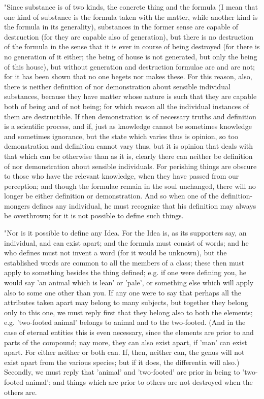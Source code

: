 "Since substance is of two kinds, the concrete thing and the formula
(I mean that one kind of substance is the formula taken with the matter,
while another kind is the formula in its generality), substances in
the former sense are capable of destruction (for they are capable
also of generation), but there is no destruction of the formula in
the sense that it is ever in course of being destroyed (for there
is no generation of it either; the being of house is not generated,
but only the being of this house), but without generation and destruction
formulae are and are not; for it has been shown that no one begets
nor makes these. For this reason, also, there is neither definition
of nor demonstration about sensible individual substances, because
they have matter whose nature is such that they are capable both of
being and of not being; for which reason all the individual instances
of them are destructible. If then demonstration is of necessary truths
and definition is a scientific process, and if, just as knowledge
cannot be sometimes knowledge and sometimes ignorance, but the state
which varies thus is opinion, so too demonstration and definition
cannot vary thus, but it is opinion that deals with that which can
be otherwise than as it is, clearly there can neither be definition
of nor demonstration about sensible individuals. For perishing things
are obscure to those who have the relevant knowledge, when they have
passed from our perception; and though the formulae remain in the
soul unchanged, there will no longer be either definition or demonstration.
And so when one of the definition-mongers defines any individual,
he must recognize that his definition may always be overthrown; for
it is not possible to define such things. 

"Nor is it possible to define any Idea. For the Idea is, as its supporters
say, an individual, and can exist apart; and the formula must consist
of words; and he who defines must not invent a word (for it would
be unknown), but the established words are common to all the members
of a class; these then must apply to something besides the thing defined;
e.g. if one were defining you, he would say 'an animal which is lean'
or 'pale', or something else which will apply also to some one other
than you. If any one were to say that perhaps all the attributes taken
apart may belong to many subjects, but together they belong only to
this one, we must reply first that they belong also to both the elements;
e.g. 'two-footed animal' belongs to animal and to the two-footed.
(And in the case of eternal entities this is even necessary, since
the elements are prior to and parts of the compound; nay more, they
can also exist apart, if 'man' can exist apart. For either neither
or both can. If, then, neither can, the genus will not exist apart
from the various species; but if it does, the differentia will also.)
Secondly, we must reply that 'animal' and 'two-footed' are prior in
being to 'two-footed animal'; and things which are prior to others
are not destroyed when the others are. 

